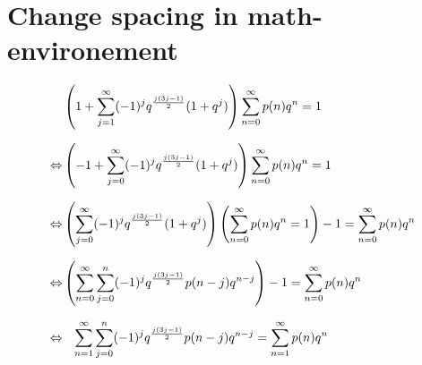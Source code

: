 \documentclass{article}
\begin{document}
	\section*{Change spacing in math-environement}
	\begin{equation*}
		\setlength{\jot}{10pt}
		\begin{aligned}
			&\left(1+\sum_{j=1}^{\infty}(-1)^j q^{\frac{j(3j-1)}{2}} (1+q^j)\right)
			\sum_{n=0}^{\infty}p(n)q^n=1\\
			\Leftrightarrow&\left(-1+\sum_{j=0}^{\infty}(-1)^j q^{\frac{j(3j-1)}{2}} (1+q^j)\right)
			\sum_{n=0}^{\infty}p(n)q^n=1\\
			\Leftrightarrow&\left(\sum_{j=0}^{\infty}(-1)^j q^{\frac{j(3j-1)}{2}} (1+q^j)\right)\left(\sum_{n=0}^{\infty}p(n)q^n=1\right)-1=\sum_{n=0}^{\infty}p(n)q^n\\
			\Leftrightarrow&\left(\sum_{n=0}^{\infty}\sum_{j=0}^{n}(-1)^j q^{\frac{j(3j-1)}{2}}p(n-j)q^{n-j}\right)-1
			=\sum_{n=0}^{\infty}p(n)q^n\\
			\Leftrightarrow&\phantom{\Biggl(}\sum_{n=1}^{\infty}\sum_{j=0}^{n}(-1)^j q^{\frac{j(3j-1)}{2}}p(n-j)q^{n-j}
			=\sum_{n=1}^{\infty}p(n)q^n
		\end{aligned}
	\end{equation*}
\end{document}
